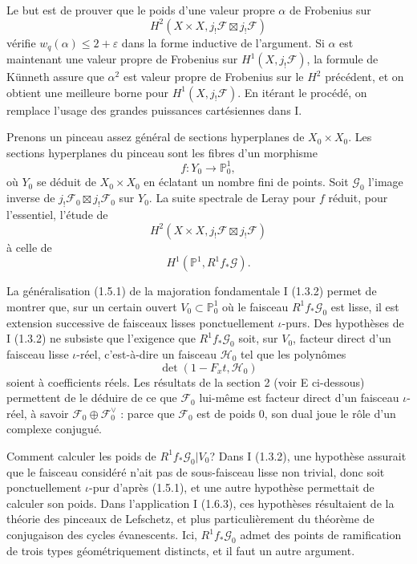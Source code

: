 \documentclass[11pt]{article}
\theoremstyle{remark}
\begin{document}
Le but est de prouver que le poids d'une valeur propre $\alpha$ de Frobenius sur
\[
H^2(X\times X,j_!\mathcal F\boxtimes j_!\mathcal F)
\]
vérifie $w_q(\alpha)\le 2+\varepsilon$ dans la forme inductive de l'argument. Si $\alpha$ est maintenant une valeur propre de Frobenius sur $H^1(X,j_!\mathcal F)$, la formule de Künneth assure que $\alpha^2$ est valeur propre de Frobenius sur le $H^2$ précédent, et on obtient une meilleure borne pour $H^1(X,j_!\mathcal F)$. En itérant le procédé, on remplace l'usage des grandes puissances cartésiennes dans I.

Prenons un pinceau assez général de sections hyperplanes de $X_0\times X_0$. Les sections hyperplanes du pinceau sont les fibres d'un morphisme
\[
f:Y_0\longrightarrow \mathbb P^1_0,
\]
où $Y_0$ se déduit de $X_0\times X_0$ en éclatant un nombre fini de points. Soit $\mathcal G_0$ l'image inverse de $j_!\mathcal F_0\boxtimes j_!\mathcal F_0$ sur $Y_0$. La suite spectrale de Leray pour $f$ réduit, pour l'essentiel, l'étude de
\[
H^2(X\times X,j_!\mathcal F\boxtimes j_!\mathcal F)
\]
à celle de
\[
H^1(\mathbb P^1,R^1 f_*\mathcal G).
\]

La généralisation (1.5.1) de la majoration fondamentale I (1.3.2) permet de montrer que, sur un certain ouvert $V_0\subset\mathbb P^1_0$ où le faisceau $R^1f_*\mathcal G_0$ est lisse, il est extension successive de faisceaux lisses ponctuellement $\iota$-purs. Des hypothèses de I (1.3.2) ne subsiste que l'exigence que $R^1f_*\mathcal G_0$ soit, sur $V_0$, facteur direct d'un faisceau lisse $\iota$-réel, c'est-à-dire un faisceau $\mathcal H_0$ tel que les polynômes
\[
\det(1-F_xt,\mathcal H_0)
\]
soient à coefficients réels. Les résultats de la section 2 (voir E ci-dessous) permettent de le déduire de ce que $\mathcal F_0$ lui-même est facteur direct d'un faisceau $\iota$-réel, à savoir $\mathcal F_0\oplus\mathcal F_0^\vee$ : parce que $\mathcal F_0$ est de poids $0$, son dual joue le rôle d'un complexe conjugué.

Comment calculer les poids de $R^1f_*\mathcal G_0|V_0$? Dans I (1.3.2), une hypothèse assurait que le faisceau considéré n'ait pas de sous-faisceau lisse non trivial, donc soit ponctuellement $\iota$-pur d'après (1.5.1), et une autre hypothèse permettait de calculer son poids. Dans l'application I (1.6.3), ces hypothèses résultaient de la théorie des pinceaux de Lefschetz, et plus particulièrement du théorème de conjugaison des cycles évanescents. Ici, $R^1f_*\mathcal G_0$ admet des points de ramification de trois types géométriquement distincts, et il faut un autre argument.
\end{document}
